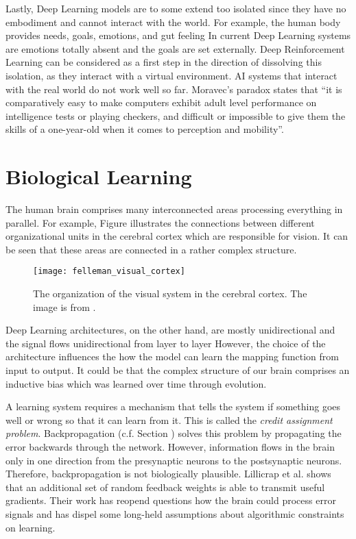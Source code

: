 Lastly, Deep Learning models are to some extend too isolated since they have no embodiment and cannot interact with the world.
For example, the human body provides needs, goals, emotions, and gut feeling%
In current Deep Learning systems are emotions totally absent and the goals are set externally.
Deep Reinforcement Learning can be considered as a first step in the direction of dissolving this isolation, as they interact with a virtual environment. 
AI systems that interact with the real world do not work well so far.
Moravec's paradox  states that ``it is comparatively easy to make computers exhibit adult level performance on intelligence tests or playing checkers, and difficult or impossible to give them the skills of a one-year-old when it comes to perception and mobility''.


\section{Biological Learning}
The human brain comprises many interconnected areas processing everything in parallel.
For example, Figure  illustrates the connections between different organizational units in the cerebral cortex which are responsible for vision.
It can be seen that these areas are connected in a rather complex structure.
\begin{figure}[h]
    \centering
    \texttt{[image: felleman\_visual\_cortex]}
    \caption[Organization of the visual system in the cerebral cortex]{The organization of the visual system in the cerebral cortex. The image is from .}
\end{figure}
Deep Learning architectures, on the other hand, are mostly unidirectional and the signal flows unidirectional from layer to layer%
However, the choice of the architecture influences the how the model can learn the mapping function from input to output.
It could be that the complex structure of our brain comprises an inductive bias which was learned over time through evolution.

A learning system requires a mechanism that tells the system if something goes well or wrong so that it can learn from it.
This is called the \emph{credit assignment problem}.
Backpropagation (c.f. Section ) solves this problem by propagating the error backwards through the network.
However, information flows in the brain only in one direction from the presynaptic neurons to the postsynaptic neurons.
Therefore, backpropagation is not biologically plausible.
Lillicrap et al.  shows that an additional set of random feedback weights is able to transmit useful gradients.
Their work has reopend questions how the brain could process error signals and has dispel some long-held assumptions about algorithmic constraints on learning.

